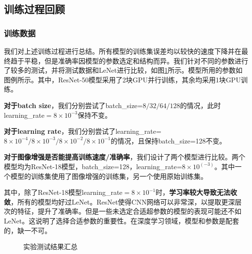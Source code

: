 \documentclass[hyperref, UTF8, 12pt]{article}
\theoremstyle{definition}
\begin{document}
\subsection{训练过程回顾}

\subsubsection{训练数据}
我们对上述训练过程进行总结。所有模型的训练集误差均以较快的速度下降并在最终趋于平稳，但是准确率因模型的参数选定和结构而异。我们针对不同的参数进行了较多的测试，并将测试数据和LeNet进行比较，如图\ref{fig:total}所示。模型所用的参数如图例所示。其中，ResNet-50模型采用了2块GPU并行训练，其余均采用1块GPU训练。

\textbf{对于batch size}，我们分别尝试了batch\_size=$8 / 32 / 64 / 128$的情况，此时learning\_rate$=8\times 10^{-3}$保持不变。

\textbf{对于learning rate}，我们分别尝试了learning\_rate=$8\times 10^{-4} / 8\times10^{-3} / 8\times10^{-2} / 8\times10^{-1}$的情况，且保持batch\_size=128不变。

\textbf{对于图像增强是否能提高训练速度/准确率}，我们设计了两个模型进行比较。两个模型均为ResNet-18模型，batch\_size=128，learning\_rate=$8\times10^(-3)$。其中一个模型的训练集使用了图像增强的训练集，另一个使用原始训练集。

其中，除了ResNet-18模型learning\_rate$=8\times 10^{-1}$时，\textbf{学习率较大导致无法收敛}，所有的模型均好过LeNet。ResNet使得CNN网络可以非常深，以提取更深层次的特征，提升了准确率。但是一些未选定合适超参数的模型的表现可能还不如LeNet。这说明了选择合适参数的重要性。在深度学习领域，模型和参数是配套的，缺一不可。
\begin{figure}[H]
	\centering
	\caption{实验测试结果汇总}
	\label{fig:total}
\end{figure}
\end{document}
